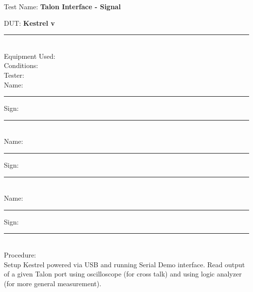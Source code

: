 \noindent
{\Huge Test Name: \textbf{Talon Interface - Signal}}\\[20pt]
{\Large DUT: \textbf{Kestrel v}\rule{1cm}{0.15mm}} \\[10pt]
{\Large Equipment Used: }\\[40pt]
{\Large Conditions: }\\[40pt]
{\Large Tester: }\\[10pt]
Name: \rule{4cm}{0.15mm} \hfill Sign: \rule{4cm}{0.15mm}\\[5pt]
Name: \rule{4cm}{0.15mm} \hfill Sign: \rule{4cm}{0.15mm}\\[5pt]
Name: \rule{4cm}{0.15mm} \hfill Sign: \rule{4cm}{0.15mm}\\[15pt]
{\Large Procedure: }\\
Setup Kestrel powered via USB and running Serial Demo interface. Read output of a given Talon port using oscilloscope (for cross talk) and using logic analyzer (for more general measurement). 


